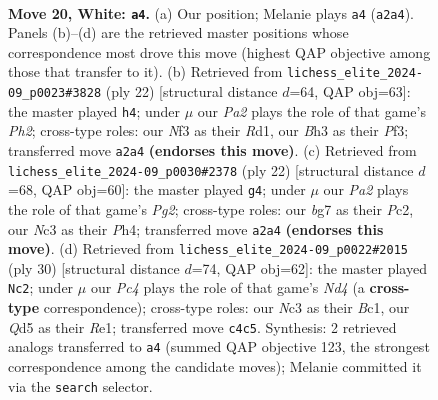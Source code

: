 \documentclass[11pt]{article}
\begin{document}
\clearpage

\begin{figure}[p]\centering
\begin{subfigure}{0.46\textwidth}\centering
\resizebox{\linewidth}{!}{%
\newchessgame
\chessboard[
  setfen={2bq1r1k/rp1pppbp/p2n4/3Q4/2P5/2NP1N1B/PP3P1P/R1B2RK1 w - - 3 20},
  showmover=false,
  pgfstyle=straightmove, color=movearrow, markmove={a2-a4}
]}
\caption{}
\end{subfigure}\hfill
\begin{subfigure}{0.46\textwidth}\centering
\resizebox{\linewidth}{!}{%
\newchessgame
\chessboard[
  setfen={r3k2r/1pqbbppp/p2ppn2/6B1/3QP3/2N2P2/PPP3PP/1K1R1B1R w kq - 1 12},
  showmover=false,
  pgfstyle=straightmove, color=movearrow, markmove={h2-h4}
]}
\caption{}
\end{subfigure}
\\[4pt]
\begin{subfigure}{0.46\textwidth}\centering
\resizebox{\linewidth}{!}{%
\newchessgame
\chessboard[
  setfen={r1bq1rk1/4bppp/p2ppn2/1p4B1/3QP2P/2N2P2/PPP3P1/2KR1B1R w - - 1 12},
  showmover=false,
  pgfstyle=straightmove, color=movearrow, markmove={g2-g4}
]}
\caption{}
\end{subfigure}\hfill
\begin{subfigure}{0.46\textwidth}\centering
\resizebox{\linewidth}{!}{%
\newchessgame
\chessboard[
  setfen={r1b2rk1/1pq2ppp/p2b1n2/4p3/3N4/1BP2Q1P/PP3PP1/R1B1R1K1 w - - 0 16},
  showmover=false,
  pgfstyle=straightmove, color=movearrow, markmove={d4-c2}
]}
\caption{}
\end{subfigure}
\caption{\textbf{Move 20, White: \texttt{a4}.} (a) Our position; Melanie plays \texttt{a4} (\texttt{a2a4}). Panels (b)--(d) are the retrieved master positions whose correspondence most drove this move (highest QAP objective among those that transfer to it). (b) Retrieved from \texttt{lichess\_elite\_2024-09\_p0023\#3828} (ply 22) [structural distance $d$=64, QAP obj=63]: the master played \texttt{h4}; under $\mu$ our \emph{Pa2} plays the role of that game's \emph{Ph2}; cross-type roles: our \emph{N}f3 as their \emph{R}d1, our \emph{B}h3 as their \emph{P}f3; transferred move \texttt{a2a4} \textbf{(endorses this move)}. (c) Retrieved from \texttt{lichess\_elite\_2024-09\_p0030\#2378} (ply 22) [structural distance $d$=68, QAP obj=60]: the master played \texttt{g4}; under $\mu$ our \emph{Pa2} plays the role of that game's \emph{Pg2}; cross-type roles: our \emph{b}g7 as their \emph{P}c2, our \emph{N}c3 as their \emph{P}h4; transferred move \texttt{a2a4} \textbf{(endorses this move)}. (d) Retrieved from \texttt{lichess\_elite\_2024-09\_p0022\#2015} (ply 30) [structural distance $d$=74, QAP obj=62]: the master played \texttt{Nc2}; under $\mu$ our \emph{Pc4} plays the role of that game's \emph{Nd4} (a \textbf{cross-type} correspondence); cross-type roles: our \emph{N}c3 as their \emph{B}c1, our \emph{Q}d5 as their \emph{R}e1; transferred move \texttt{c4c5}. Synthesis: 2 retrieved analogs transferred to \texttt{a4} (summed QAP objective 123, the strongest correspondence among the candidate moves); Melanie committed it via the \texttt{search} selector.}
\label{fig:thought-m38}
\end{figure}
\end{document}
